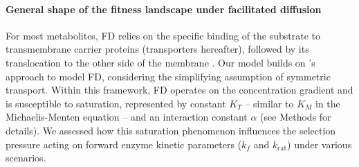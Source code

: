\noindent \paragraph{General shape of the fitness landscape under facilitated diffusion}

For most metabolites, FD relies on the specific binding of the substrate to transmembrane carrier proteins (transporters hereafter), followed by its translocation to the other side of the membrane \citep{danielli1954,Kotyk67,Stein86d}. Our model builds on \citet{Kuile94}'s approach to model FD, considering the simplifying assumption of symmetric transport. Within this framework, FD operates on the concentration gradient \citep{Bosdriesz18} and is susceptible to saturation, represented by constant $K_T$ -- similar to $K_M$ in the Michaelis-Menten equation -- and an interaction constant $\alpha$ (see Methods for details). We assessed how this saturation phenomenon influences the selection pressure acting on forward enzyme kinetic parameters ($k_f$ and $k_\text{cat}$) under various scenarios. 

